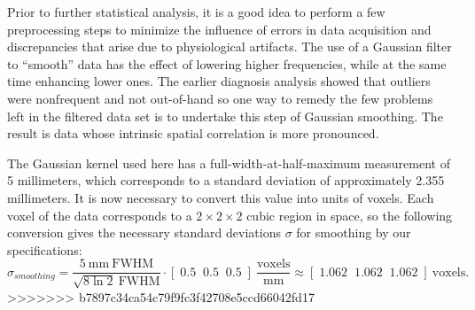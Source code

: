 
\par Prior to further statistical analysis, it is a good idea to perform a few
preprocessing steps to minimize the influence of errors in data acquisition and
discrepancies that arise due to physiological artifacts. The use of a Gaussian
filter to ``smooth'' data has the effect of lowering higher frequencies, while
at the same time enhancing lower ones. The earlier diagnosis analysis showed
that outliers were nonfrequent and not out-of-hand so one way to remedy the few
problems left in the filtered data set is to undertake this step of Gaussian
smoothing. The result is data whose intrinsic spatial correlation is more
pronounced.

\par \indent The Gaussian kernel used here has a full-width-at-half-maximum
measurement of 5 millimeters, which corresponds to a standard deviation of
approximately 2.355 millimeters. It is now necessary to convert this value into
units of voxels. Each voxel of the data corresponds to a $2 \times 2 \times 2$
cubic region in space, so the following conversion gives the necessary standard
deviations $\sigma$ for smoothing by our specifications:
\[
\sigma_{smoothing} = \frac{ 5 \ \mathrm{ mm \ FWHM } }{ \sqrt{ 8 \ln{ 2 } } \
\mathrm{ FWHM } } \cdot \left[ \; 0.5 \; \; 0.5 \; \; 0.5 \; \right] \
\frac{ \mathrm{ voxels } }{ \mathrm{ mm } } \approx
\left[ \; 1.062 \; \; 1.062 \; \; 1.062 \; \right] \ \mathrm{ voxels } .
\]
>>>>>>> b7897c34ca54c79f9fc3f42708e5ccd66042fd17
